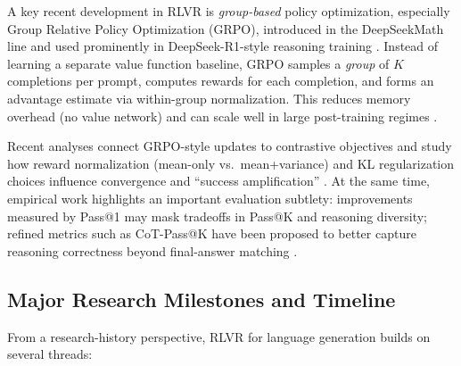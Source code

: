 \documentclass[10pt]{article}
\begin{document}
A key recent development in RLVR is \emph{group-based} policy optimization, especially Group Relative Policy Optimization (GRPO), introduced in the DeepSeekMath line and used prominently in DeepSeek-R1-style reasoning training \cite{deepseekai2024deepseekmath,guo2025deepseekr1}.
Instead of learning a separate value function baseline, GRPO samples a \emph{group} of $K$ completions per prompt, computes rewards for each completion, and forms an advantage estimate via within-group normalization.
This reduces memory overhead (no value network) and can scale well in large post-training regimes \cite{deepseekai2024deepseekmath,mroueh2025grpo}.

Recent analyses connect GRPO-style updates to contrastive objectives and study how reward normalization (mean-only vs.\ mean+variance) and KL regularization choices influence convergence and ``success amplification'' \cite{mroueh2025grpo}.
At the same time, empirical work highlights an important evaluation subtlety: improvements measured by Pass@1 may mask tradeoffs in Pass@K and reasoning diversity; refined metrics such as CoT-Pass@K have been proposed to better capture reasoning correctness beyond final-answer matching \cite{wen2025rlvr}.

\subsection{Major Research Milestones and Timeline}

From a research-history perspective, RLVR for language generation builds on several threads:
\end{document}
